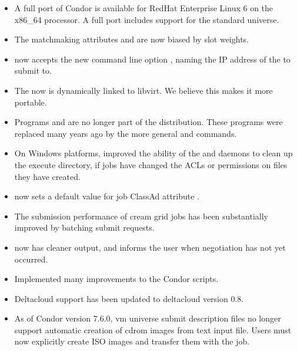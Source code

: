 \begin{itemize}

\item A full port of Condor is available for RedHat Enterprise Linux 6
on the x86\_64 processor.
A full port includes support for the standard universe.

\item The matchmaking attributes 
and  are now biased by slot weights.

\item {} now accepts the new command line option ,
naming the IP address of the  to submit to.

\item The  now is dynamically linked to libvirt.  
We believe this makes it more portable.

\item Programs  and 
are no longer part of the distribution.
These programs were replaced many years ago by the more general
 and  commands.

\item On Windows platforms, improved the ability of the 
and  daemons to clean up the execute directory,
if jobs have changed the ACLs or permissions on files they have created.

\item {} now sets a default value for job ClassAd attribute
.

\item The submission performance of cream grid jobs has been substantially
improved by batching submit requests.

\item {}  now has cleaner output, and informs
the user when negotiation has not yet occurred.

\item Implemented many improvements to the Condor  scripts.

\item Deltacloud support has been updated to deltacloud version 0.8.

\item As of Condor version 7.6.0,
vm universe submit description files no longer support
automatic creation of cdrom images from text input file.
Users must now explicitly create ISO images and transfer them
with the job.


\end{itemize}
